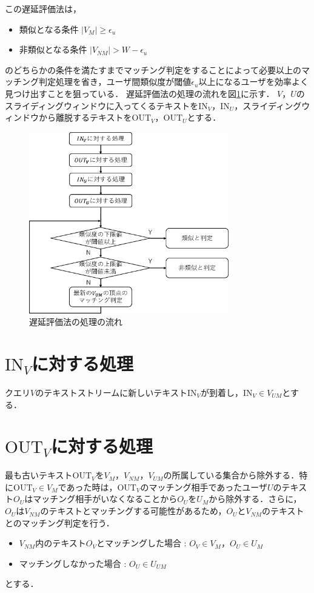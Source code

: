 この遅延評価法は，
\begin{itemize}
    \item 類似となる条件 $|V_M|\geq\epsilon_u$
    \item 非類似となる条件 $|V_{NM}|>W-\epsilon_u$
\end{itemize}
のどちらかの条件を満たすまでマッチング判定をすることによって必要以上のマッチング判定処理を省き，ユーザ間類似度が閾値$\epsilon_u$以上になるユーザを効率よく見つけ出すことを狙っている．
遅延評価法の処理の流れを図\ref{fig:lazy}に示す．
$V$，$U$のスライディングウィンドウに入ってくるテキストを$\mbox{IN}_V$，$\mbox{IN}_U$，スライディングウィンドウから離脱するテキストを$\mbox{OUT}_V$，$\mbox{OUT}_U$とする．
\begin{figure}[htb]
    \centering
    \includegraphics[width=8.7cm]{img/delay.eps}
    \caption{遅延評価法の処理の流れ}
    \label{fig:lazy}
\end{figure}

\section{\texorpdfstring{$\mbox{IN}_{V}$}　に対する処理}
クエリ$V$のテキストストリームに新しいテキスト$\mbox{IN}_V$が到着し，$\mbox{IN}_V \in V_{UM}$とする．

\section{\texorpdfstring{$\mbox{OUT}_V$}　に対する処理}
最も古いテキスト$\mbox{OUT}_V$を$V_M$，$V_{NM}$，$V_{UM}$の所属している集合から除外する．特に$\mbox{OUT}_V \in V_{M}$であった時は，$\mbox{OUT}_V$のマッチング相手であったユーザ$U$のテキスト$O_U$はマッチング相手がいなくなることから$O_U$を$U_{M}$から除外する．さらに，$O_U$は$V_{NM}$のテキストとマッチングする可能性があるため，$O_U$と$V_{NM}$のテキストとのマッチング判定を行う．
\begin{itemize}
    \item $V_{NM}$内のテキスト$O_V$とマッチングした場合 : $O_V \in V_{M}，O_U \in U_{M}$
    \item マッチングしなかった場合 : $O_U \in U_{UM}$
\end{itemize}
とする．


